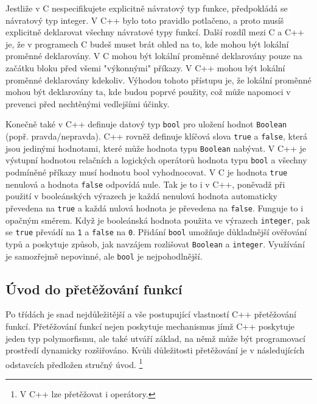     Jestliže v C nespecifikujete explicitně návratový typ funkce, předpokládá se návratový typ integer. V C++ bylo toto pravidlo
    potlačeno, a proto musíš explicitně deklarovat všechny návratové typy funkcí.
    Další rozdíl mezi C a C++ je, že v programech C budeš muset brát ohled na to, kde mohou být lokální proměnné deklarovány. V C
    mohou být lokální proměnné deklarovány pouze na začátku bloku před všemi "výkonnými" příkazy. V C++ mohou být lokální
    proměnné deklarovány kdekoliv. Výhodou tohoto přístupu je, že lokální proměnné mohou být deklarovány ta, kde budou poprvé
    použity, což může napomoci v prevenci před nechtěnými vedlejšími účinky.

    Konečně také v C++ definuje datový typ \lstinline[basicstyle=\ttfamily]!bool! pro uložení  hodnot
    \lstinline[basicstyle=\ttfamily]!Boolean! (popř. pravda/nepravda). C++ rovněž definuje klíčová slova
    \lstinline[basicstyle=\ttfamily]!true! a \lstinline[basicstyle=\ttfamily]!false!, která jsou jedinými hodnotami, které může
    hodnota typu \lstinline[basicstyle=\ttfamily]!Boolean! nabývat. V C++ je výstupní hodnotou relačních a logických operátorů
    hodnota typu \lstinline[basicstyle=\ttfamily]!bool! a všechny podmíněné příkazy musí hodnotu bool vyhodnocovat. V C je
    hodnota \lstinline[basicstyle=\ttfamily]!true! nenulová a hodnota \lstinline[basicstyle=\ttfamily]!false! odpovídá nule. Tak
    je to i v C++, poněvadž při použití v booleánských výrazech je každá nenulová hodnota automaticky převedena na
    \lstinline[basicstyle=\ttfamily]!true! a každá nulová hodnota je převedena na \lstinline[basicstyle=\ttfamily]!false!.
    Funguje to i opačným směrem. Když je booleánská hodnota použita ve výrazech \lstinline[basicstyle=\ttfamily]!integer!, pak se
    \lstinline[basicstyle=\ttfamily]!true! převádí na \lstinline[basicstyle=\ttfamily]!1! a
    \lstinline[basicstyle=\ttfamily]!false! na \lstinline[basicstyle=\ttfamily]!0!.  Přidání
    \lstinline[basicstyle=\ttfamily]!bool! umožňuje důkladnější ověřování typů a poskytuje způsob, jak navzájem rozlišovat
    \lstinline[basicstyle=\ttfamily]!Boolean! a \lstinline[basicstyle=\ttfamily]!integer!. Využívání je samozřejmě nepovinné, ale
    \lstinline[basicstyle=\ttfamily]!bool! je nejpohodlnější.

  \subsection{Úvod do přetěžování funkcí}
    Po třídách je snad nejdůležitější a vše postupující vlastností C++ přetě\-žování funkcí. Přetěžování funkcí nejen poskytuje
    mechanismus jímž C++ poskytuje jeden typ polymorfismu, ale také utváří základ, na němž může být programovací prostředí
    dynamicky rozšiřováno. Kvůli důležitosti přetěžování je v následujících odstavcích předložen stručný úvod. \footnote{V C++
    lze přetěžovat i operátory.}

